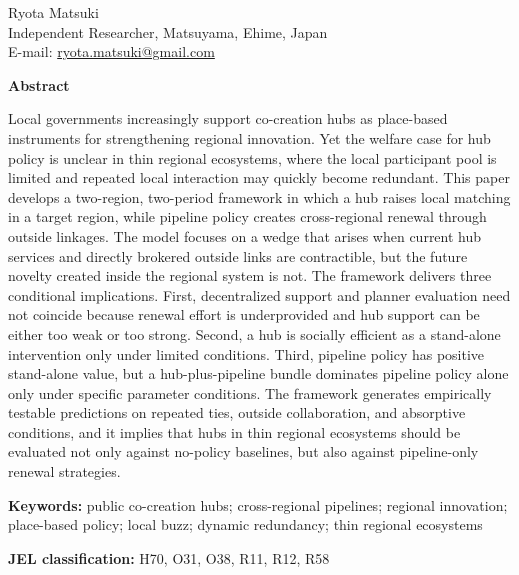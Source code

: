 \documentclass[12pt]{article}
\title{\papertitle}
\author{}
\date{}
\makeatletter
\newif\ifblind
\theoremstyle{plain}
\theoremstyle{remark}
\newcommand{\authorname}{Ryota Matsuki}
\newcommand{\authoraffil}{Independent Researcher, Matsuyama, Ehime, Japan}
\newcommand{\authoremail}{ryota.matsuki@gmail.com}
\newcommand{\JELcodes}{H70, O31, O38, R11, R12, R58}
\newcommand{\keywordslist}{public co-creation hubs; cross-regional pipelines; regional innovation; place-based policy; local buzz; dynamic redundancy; thin regional ecosystems}
\makeatother
\begin{document}
\maketitle
\thispagestyle{plain}

\ifblind
\begin{center}
\normalsize
\emph{Author information omitted for double-blind review.}
\end{center}
\vspace{0.6em}
\else
\begin{center}
\normalsize
\authorname\\
\authoraffil\\
E-mail: \href{mailto:\authoremail}{\authoremail}
\end{center}
\vspace{0.6em}
\fi

\noindent\textbf{Abstract}

\noindent
Local governments increasingly support co-creation hubs as place-based instruments for strengthening regional innovation. Yet the welfare case for hub policy is unclear in thin regional ecosystems, where the local participant pool is limited and repeated local interaction may quickly become redundant. This paper develops a two-region, two-period framework in which a hub raises local matching in a target region, while pipeline policy creates cross-regional renewal through outside linkages. The model focuses on a wedge that arises when current hub services and directly brokered outside links are contractible, but the future novelty created inside the regional system is not. The framework delivers three conditional implications. First, decentralized support and planner evaluation need not coincide because renewal effort is underprovided and hub support can be either too weak or too strong. Second, a hub is socially efficient as a stand-alone intervention only under limited conditions. Third, pipeline policy has positive stand-alone value, but a hub-plus-pipeline bundle dominates pipeline policy alone only under specific parameter conditions. The framework generates empirically testable predictions on repeated ties, outside collaboration, and absorptive conditions, and it implies that hubs in thin regional ecosystems should be evaluated not only against no-policy baselines, but also against pipeline-only renewal strategies.

\vspace{0.8em}
\noindent\textbf{Keywords:} \keywordslist

\vspace{0.35em}
\noindent\textbf{JEL classification:} \JELcodes
\end{document}
